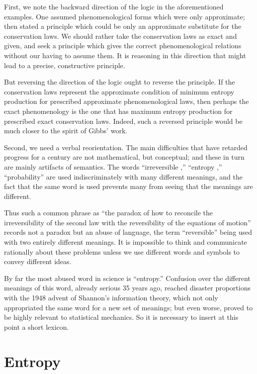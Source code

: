 \documentclass{article}
\begin{document}
First, we note the backward direction of the logic in the aforementioned examples. One assumed phenomenological forms which were only approximate; then stated a principle which could be only an approximate substitute for the conservation laws. We should rather take the conservation laws as exact and given, and seek a principle which gives the correct phenomenological relations without our having to assume them. It is reasoning in this direction that might lead to a precise, constructive principle.

But reversing the direction of the logic ought to reverse the principle. If the conservation laws represent the approximate condition of minimum entropy production for prescribed approximate phenomenological laws, then perhaps the exact phenomenology is the one that has maximum entropy production for prescribed exact conservation laws. Indeed, such a reversed principle would be much closer to the spirit of Gibbs' work.

Second, we need a verbal reorientation. The main difficulties that have retarded progress for a century are not mathematical, but conceptual; and these in turn are mainly artifacts of semantics. The words ``irreversible ,'' ``entropy ,'' ``probability'' are used indiscriminately with many different meanings, and the fact that the same word is used prevents many from seeing that the meanings are different.

Thus such a common phrase as ``the paradox of how to reconcile the irreversibility of the second law with the reversibility of the equations of motion'' records not a paradox but an abuse of language, the term ``reversible'' being used with two entirely different meanings. It is impossible to think and communicate rationally about these problems unless we use different words and symbols to convey different ideas.

By far the most abused word in science is ``entropy.'' Confusion over the different meanings of this word, already serious 35 years ago, reached disaster proportions with the 1948 advent of Shannon's information theory, which not only appropriated the same word for a new set of meanings; but even worse, proved to be highly relevant to statistical mechanics. So it is necessary to insert at this point a short lexicon.

\section{Entropy}
\end{document}
